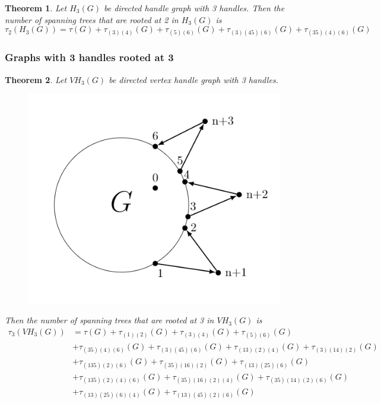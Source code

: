 \documentclass[twoside,11pt]{article}
\newtheorem{theorem}{Theorem}[section]
\numberwithin{equation}{section} \DeclareMathOperator{\Var}{Var}
\newcommand{\bthm}{\begin{theorem}}
\newcommand{\ethm}{\end{theorem}}
\begin{document}
\bthm
Let $H_3(G)$ be directed handle graph with 3 handles. Then the number of spanning trees that are rooted at 2 in $H_3(G)$ is
\[
\tau_2(H_3(G)) = \tau(G) + \tau_{(3)(4)}(G) + \tau_{(5)(6)}(G) + \tau_{(3)(45)(6)}(G)+ \tau_{(35)(4)(6)}(G)
\]
\ethm

\subsubsection{Graphs with 3 handles rooted at 3}
\bthm
Let $VH_3(G)$ be directed vertex handle graph with 3 handles. 
\begin{figure}[H]
    \centering
    \includegraphics[scale=0.4]{tik_3handles.PNG}
\end{figure}
Then the number of spanning trees that are rooted at 3 in $VH_3(G)$ is
\begin{equation*}
    \begin{split}
        \tau_3(VH_3(G)) &= \tau(G) + \tau_{(1)(2)}(G)+ \tau_{(3)(4)}(G) + \tau_{(5)(6)}(G)\\ 
        &+ \tau_{(35)(4)(6)}(G) + \tau_{(3)(45)(6)}(G) + \tau_{(13)(2)(4)}(G) + \tau_{(3)(14)(2)}(G)\\
        &+ \tau_{(135)(2)(6)}(G) + \tau_{(35)(16)(2)}(G) + \tau_{(13)(25)(6)}(G)\\
        &+ \tau_{(135)(2)(4)(6)}(G) + \tau_{(35)(16)(2)(4)}(G) + \tau_{(35)(14)(2)(6)}(G)\\
&+ \tau_{(13)(25)(6)(4)}(G) + \tau_{(13)(45)(2)(6)}(G)
    \end{split}
\end{equation*}
\ethm
\end{document}
